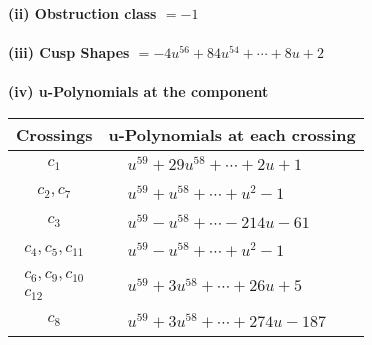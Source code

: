\documentclass[1p]{elsarticle_modified}
\theoremstyle{definition}
\begin{document}
\flushleft \textbf{(ii) Obstruction class $= -1$}\\~\\
\flushleft \textbf{(iii) Cusp Shapes $= -4 u^{56}+84 u^{54}+\cdots+8 u+2$}\\~\\
\newpage\renewcommand{\arraystretch}{1}
\flushleft \textbf{(iv) u-Polynomials at the component}\newline \\
\begin{tabular}{m{50pt}|m{274pt}}
Crossings & \hspace{64pt}u-Polynomials at each crossing \\
\hline $$\begin{aligned}c_{1}\end{aligned}$$&$\begin{aligned}
&u^{59}+29 u^{58}+\cdots+2 u+1
\end{aligned}$\\
\hline $$\begin{aligned}c_{2},c_{7}\end{aligned}$$&$\begin{aligned}
&u^{59}+u^{58}+\cdots+u^2-1
\end{aligned}$\\
\hline $$\begin{aligned}c_{3}\end{aligned}$$&$\begin{aligned}
&u^{59}- u^{58}+\cdots-214 u-61
\end{aligned}$\\
\hline $$\begin{aligned}c_{4},c_{5},c_{11}\end{aligned}$$&$\begin{aligned}
&u^{59}- u^{58}+\cdots+u^2-1
\end{aligned}$\\
\hline $$\begin{aligned}c_{6},c_{9},c_{10}\\c_{12}\end{aligned}$$&$\begin{aligned}
&u^{59}+3 u^{58}+\cdots+26 u+5
\end{aligned}$\\
\hline $$\begin{aligned}c_{8}\end{aligned}$$&$\begin{aligned}
&u^{59}+3 u^{58}+\cdots+274 u-187
\end{aligned}$\\
\hline
\end{tabular}\\~\\
\end{document}
